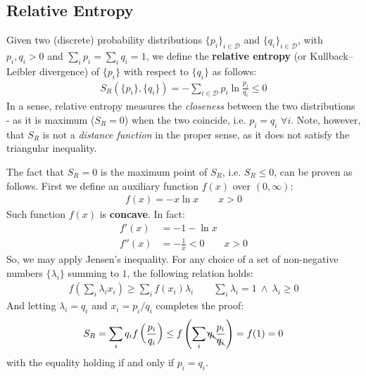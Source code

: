 \documentclass[../../main.tex]{subfiles}
\begin{document}
\subsection{Relative Entropy}
Given two (discrete) probability distributions $\{p_i\}_{i \in \mathcal{D}}$ and $\{q_i\}_{i \in \mathcal{D}}$, with $p_i, q_i > 0$ and $\sum_i p_i = \sum_i q_i = 1$, we define the \textbf{relative entropy} (or Kullback–Leibler divergence) of $\{p_i\}$ with respect to $\{q_i\}$ as follows:
\begin{align}
    S_R(\{p_i\}, \{q_i\}) = -\sum_{i \in \mathcal{D}} p_i \ln \frac{p_i}{q_i} \leq 0 \label{eqn:relative-entropy}
\end{align}  
In a sense, relative entropy measures the \textit{closeness} between the two distributions - as it is maximum ($S_R=0$) when the two coincide, i.e. $p_i = q_i$ $\forall i$. Note, however, that $S_R$ is not a \textit{distance function} in the proper sense, as it does not satisfy the triangular inequality. 

\medskip

The fact that $S_R=0$ is the maximum point of $S_R$, i.e. $S_R \leq 0$, can be proven as follows. First we define an auxiliary function $f(x)$ over $(0,\infty)$:
\begin{align*}
    f(x) = -x \ln x \qquad x > 0
\end{align*}
Such function $f(x)$ is \textbf{concave}. In fact: 
\begin{align*}
    f'(x) &= -1 - \ln x\\
    f''(x) &= -\frac{1}{x}  < 0 \qquad x > 0
\end{align*}
So, we may apply Jensen's inequality. For any choice of a set of non-negative numbers $\{\lambda_i\}$ summing to $1$, the following relation holds: %
\begin{align*}
    f\left(\sum_i \lambda_i x_i\right) \geq \sum_i f(x_i) \lambda_i \qquad \sum_i \lambda_i = 1 \> \land \> \lambda_i \geq 0
\end{align*}
And letting $\lambda_i = q_i$ and $x_i = p_i / q_i$ completes the proof:
\begin{align*}
    S_R = \sum_i q_i f\left(\frac{p_i}{q_i} \right) \leq f\left(\sum_i \bcancel{q_i} \frac{p_i}{\bcancel{q_i}} \right) = f(1) = 0
\end{align*}
with the equality holding if and only if $p_i = q_i$.
\end{document}
